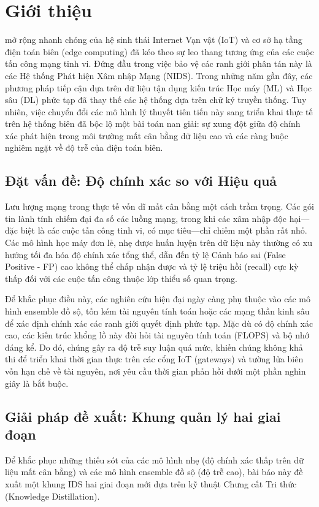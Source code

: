 \section{Giới thiệu}
 mở rộng nhanh chóng của hệ sinh thái Internet Vạn vật (IoT) và cơ sở hạ tầng điện toán biên (edge computing) đã kéo theo sự leo thang tương ứng của các cuộc tấn công mạng tinh vi. Đứng đầu trong việc bảo vệ các ranh giới phân tán này là các Hệ thống Phát hiện Xâm nhập Mạng (NIDS). Trong những năm gần đây, các phương pháp tiếp cận dựa trên dữ liệu tận dụng kiến trúc Học máy (ML) và Học sâu (DL) phức tạp đã thay thế các hệ thống dựa trên chữ ký truyền thống. Tuy nhiên, việc chuyển đổi các mô hình lý thuyết tiên tiến này sang triển khai thực tế trên hệ thống biên đã bộc lộ một bài toán nan giải: sự xung đột giữa độ chính xác phát hiện trong môi trường mất cân bằng dữ liệu cao và các ràng buộc nghiêm ngặt về độ trễ của điện toán biên.

\subsection{Đặt vấn đề: Độ chính xác so với Hiệu quả}
Lưu lượng mạng trong thực tế vốn dĩ mất cân bằng một cách trầm trọng. Các gói tin lành tính chiếm đại đa số các luồng mạng, trong khi các xâm nhập độc hại—đặc biệt là các cuộc tấn công tinh vi, có mục tiêu—chỉ chiếm một phần rất nhỏ. Các mô hình học máy đơn lẻ, nhẹ được huấn luyện trên dữ liệu này thường có xu hướng tối đa hóa độ chính xác tổng thể, dẫn đến tỷ lệ Cảnh báo sai (False Positive - FP) cao không thể chấp nhận được và tỷ lệ triệu hồi (recall) cực kỳ thấp đối với các cuộc tấn công thuộc lớp thiểu số quan trọng.

Để khắc phục điều này, các nghiên cứu hiện đại ngày càng phụ thuộc vào các mô hình ensemble đồ sộ, tốn kém tài nguyên tính toán hoặc các mạng thần kinh sâu để xác định chính xác các ranh giới quyết định phức tạp. Mặc dù có độ chính xác cao, các kiến trúc khổng lồ này đòi hỏi tài nguyên tính toán (FLOPS) và bộ nhớ đáng kể. Do đó, chúng gây ra độ trễ suy luận quá mức, khiến chúng không khả thi để triển khai thời gian thực trên các cổng IoT (gateways) và tường lửa biên vốn hạn chế về tài nguyên, nơi yêu cầu thời gian phản hồi dưới một phần nghìn giây là bắt buộc.

\subsection{Giải pháp đề xuất: Khung quản lý hai giai đoạn}
Để khắc phục những thiếu sót của các mô hình nhẹ (độ chính xác thấp trên dữ liệu mất cân bằng) và các mô hình ensemble đồ sộ (độ trễ cao), bài báo này đề xuất một khung IDS hai giai đoạn mới dựa trên kỹ thuật Chưng cất Tri thức (Knowledge Distillation).

